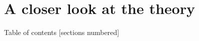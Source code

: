 \documentclass[aspectratio=169,dvipsnames,svgnames,10pt]{beamer}
\begin{document}
\section{A closer look at the theory}

\begin{frame}{Table of contents}
  [sections numbered]
\end{frame}





\end{document}
